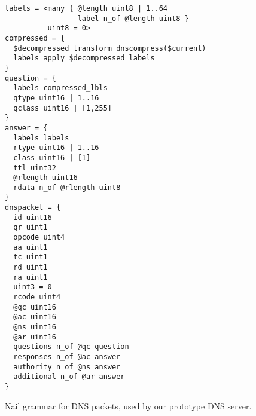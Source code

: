 \begin{figure}
\smaller[0.5]
\begin{verbatim}
labels = <many { @length uint8 | 1..64
                 label n_of @length uint8 }
          uint8 = 0>
compressed = {
  $decompressed transform dnscompress($current)
  labels apply $decompressed labels
}
question = {
  labels compressed_lbls
  qtype uint16 | 1..16
  qclass uint16 | [1,255]
}
answer = {
  labels labels
  rtype uint16 | 1..16
  class uint16 | [1]
  ttl uint32
  @rlength uint16
  rdata n_of @rlength uint8
}
dnspacket = {
  id uint16
  qr uint1
  opcode uint4
  aa uint1
  tc uint1
  rd uint1
  ra uint1
  uint3 = 0
  rcode uint4
  @qc uint16
  @ac uint16
  @ns uint16
  @ar uint16
  questions n_of @qc question
  responses n_of @ac answer
  authority n_of @ns answer
  additional n_of @ar answer
}
\end{verbatim}
\caption{Nail grammar for DNS packets, used by our prototype DNS server.}
\label{fig:dns-full}
\end{figure}
